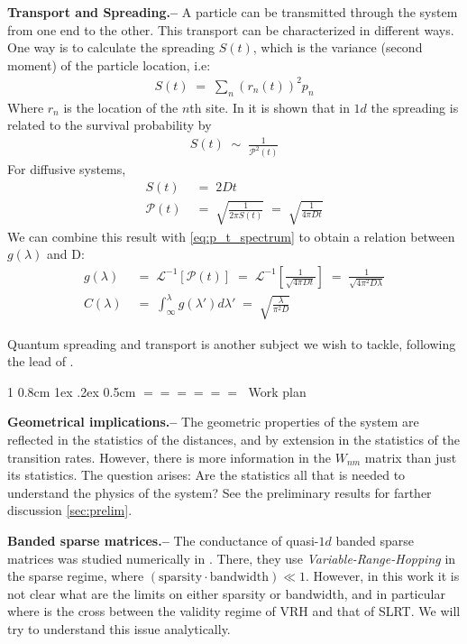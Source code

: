 \documentclass[onecolumn,fleqn,notitlepage,secnumarabic]{revtex4}
\makeatletter
\def\section{%
  \@startsection
    {section}%
    {1}%
    {\z@}%
    {0.8cm \@plus1ex \@minus .2ex}%
    {0.5cm}%
    {\Large\bf $=\!=\!=\!=\!=\!=\;$}%
}%
\makeatother
\begin{document}
{ \bf Transport and Spreading.--}  %
A particle can be transmitted through the system from one end to the other. This transport can be characterized in different ways. One way is to calculate the spreading $S(t)$, which is the variance (second moment) of the particle location, i.e:
\begin{align}
  S(t) \;=\; \sum_n (r_n(t)  )^2 p_n  %
\end{align}
Where $r_n$ is the location of the $n$th site. In \cite{Alexander:1981:RMP} it is shown that in $1d$ the spreading is related to the survival probability by
\begin{align}
S(t) \;\sim\; \frac{1}{\mathcal{P}^2(t)}
\end{align}
For diffusive systems, 
\begin{align}
S(t) &\;=\; 2Dt  \\
\mathcal{P}(t) &\;=\; \sqrt{\frac{1}{2\pi S(t)}} \;=\; \sqrt{\frac{1}{4\pi D t}}
\end{align}
We can combine this result with \autoref{eq:p_t_spectrum} to obtain a relation between $g(\lambda)$ and D:
\begin{align}
    g(\lambda) &\;=\; \mathcal{L}^{-1}[\mathcal{P}(t)] \;=\; \mathcal{L}^{-1}\left[\frac{1}{\sqrt{4\pi D t}}\right] \;=\; \frac{1}{\sqrt{4\pi^2 D\lambda}} \\
    C(\lambda) &\;=\; \int_{\infty}^{\lambda} g(\lambda')d\lambda' \;=\; \sqrt{\frac{\lambda}{\pi^2 D}} \label{eq:C_D}
\end{align}


Quantum spreading and transport is another subject we wish to tackle, following the lead of \cite{Jayannavar:1991}\cite{Guarneri:1989}\cite{Guarneri:1993}.


\section{Work plan}


{ \bf Geometrical implications.-- } The geometric properties of the system are reflected in the statistics of the distances, and by extension in the statistics of the transition rates. However, there is more information in the $W_{nm}$ matrix than just its statistics. The question arises: Are the statistics all that is needed to understand the physics of the system? See the preliminary results for farther discussion \ref{sec:prelim}.

{ \bf Banded sparse matrices.-- } The conductance of quasi-$1d$ banded sparse matrices was studied numerically in \cite{Stotland:2010:PRB}. There, they use \emph{Variable-Range-Hopping} in the sparse regime, where 
$(\text{sparsity}\cdot \text{bandwidth}) \ll 1$. However, in this work it is not clear what are the limits on either sparsity or bandwidth, and in particular where is the cross between the validity regime of VRH and that of SLRT. We will try to understand this issue analytically.
\end{document}
